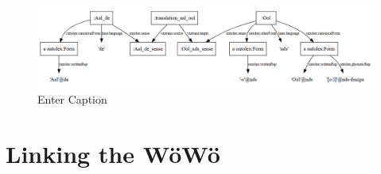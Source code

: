 \documentclass[11pt]{article}
\begin{document}
\begin{figure}
    \centering
    \includegraphics[width=1\linewidth]{aal-rdf-graph.png}
    \caption{Enter Caption}
    \label{fig:enter-label}
\end{figure}

%
%
%

\section{Linking the WöWö}
\end{document}
